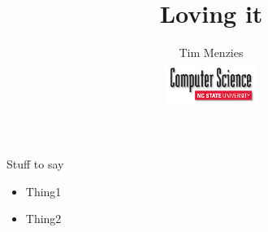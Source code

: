 \documentclass[14pt]{beamer}
\author[Tim Menzies]{Tim Menzies\\\includegraphics[width=3cm]{CSClogo}}
\title{Loving it}
\begin{document}
\begin{frame}
\titlepage
\end{frame}


\begin{frame}{Stuff to say}

\begin{itemize}
\item Thing1
\item Thing2
\end{itemize}
\end{frame}
\end{document}
